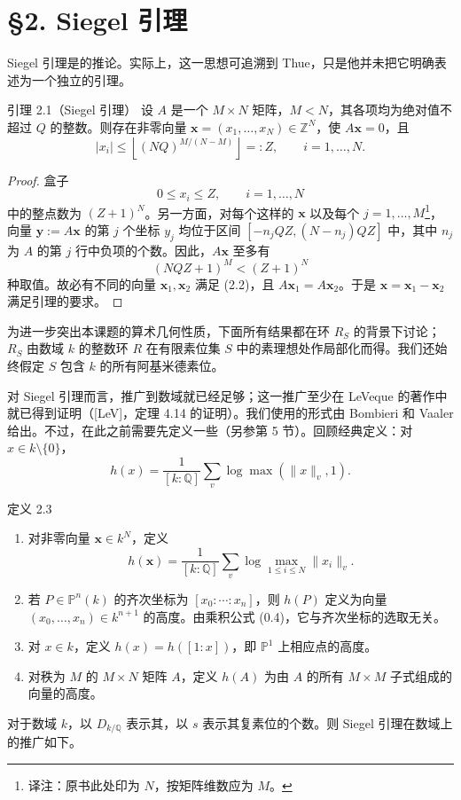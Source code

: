 \section*{§2. Siegel 引理}
Siegel 引理是的推论。实际上，这一思想可追溯到 Thue，只是他并未把它明确表述为一个独立的引理。

\begin{statement}{引理 2.1（Siegel 引理）}
设 $A$ 是一个 $M\times N$ 矩阵，$M<N$，其各项均为绝对值不超过 $Q$ 的整数。则存在非零向量 $\boldsymbol x=(x_1,\ldots,x_N)\in\mathbb Z^N$，使 $A\boldsymbol x=0$，且
\[
|x_i|\le\left\lfloor(NQ)^{M/(N-M)}\right\rfloor=:Z,
\qquad i=1,\ldots,N.
\]
\end{statement}
\begin{proof}
盒子
\begin{equation*}
0\le x_i\le Z,\qquad i=1,\ldots,N\tag{2.2}
\end{equation*}
中的整点数为 $(Z+1)^N$。另一方面，对每个这样的 $\boldsymbol x$ 以及每个 $j=1,\ldots,M$\footnote{译注：原书此处印为 $N$，按矩阵维数应为 $M$。}，向量 $\boldsymbol y:=A\boldsymbol x$ 的第 $j$ 个坐标 $y_j$ 均位于区间 $[-n_jQZ,(N-n_j)QZ]$ 中，其中 $n_j$ 为 $A$ 的第 $j$ 行中负项的个数。因此，$A\boldsymbol x$ 至多有
\[
(NQZ+1)^M<(Z+1)^N
\]
种取值。故必有不同的向量 $\boldsymbol x_1,\boldsymbol x_2$ 满足 (2.2)，且 $A\boldsymbol x_1=A\boldsymbol x_2$。于是 $\boldsymbol x=\boldsymbol x_1-\boldsymbol x_2$ 满足引理的要求。
\end{proof}
为进一步突出本课题的算术几何性质，下面所有结果都在环 $R_S$ 的背景下讨论；$R_S$ 由数域 $k$ 的整数环 $R$ 在有限素位集 $S$ 中的素理想处作局部化而得。我们还始终假定 $S$ 包含 $k$ 的所有阿基米德素位。

对 Siegel 引理而言，推广到数域就已经足够；这一推广至少在 LeVeque 的著作中就已得到证明（[LeV]，定理 4.14 的证明）。我们使用的形式由 Bombieri 和 Vaaler 给出。不过，在此之前需要先定义一些（另参第 5 节）。回顾经典定义：对 $x\in k\setminus\{0\}$，
\[
h(x)=\frac1{[k:\mathbb Q]}\sum_v\log\max(\|x\|_v,1).
\]
\begin{statement}{定义 2.3}
\begin{enumerate}[label=(\alph*).]
\item 对非零向量 $\boldsymbol x\in k^N$，定义
\[
h(\boldsymbol x)=\frac1{[k:\mathbb Q]}\sum_v\log\max_{1\le i\le N}\|x_i\|_v.
\]
\item 若 $P\in\mathbb P^n(k)$ 的齐次坐标为 $[x_0:\cdots:x_n]$，则 $h(P)$ 定义为向量 $(x_0,\ldots,x_n)\in k^{n+1}$ 的高度。由乘积公式 (0.4)，它与齐次坐标的选取无关。
\item 对 $x\in k$，定义 $h(x)=h([1:x])$，即 $\mathbb P^1$ 上相应点的高度。
\item 对秩为 $M$ 的 $M\times N$ 矩阵 $A$，定义 $h(A)$ 为由 $A$ 的所有 $M\times M$ 子式组成的向量的高度。
\end{enumerate}
\end{statement}
对于数域 $k$，以 $D_{k/\mathbb Q}$ 表示其，以 $s$ 表示其复素位的个数。则 Siegel 引理在数域上的推广如下。

